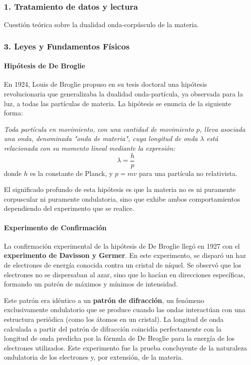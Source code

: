\subsubsection*{1. Tratamiento de datos y lectura}
Cuestión teórica sobre la dualidad onda-corpúsculo de la materia.

\subsubsection*{3. Leyes y Fundamentos Físicos}
\paragraph*{Hipótesis de De Broglie}
En 1924, Louis de Broglie propuso en su tesis doctoral una hipótesis revolucionaria que generalizaba la dualidad onda-partícula, ya observada para la luz, a todas las partículas de materia. La hipótesis se enuncia de la siguiente forma:

\textit{Toda partícula en movimiento, con una cantidad de movimiento $p$, lleva asociada una onda, denominada "onda de materia", cuya longitud de onda $\lambda$ está relacionada con su momento lineal mediante la expresión:}
$$ \lambda = \frac{h}{p} $$
donde $h$ es la constante de Planck, y $p=mv$ para una partícula no relativista.

El significado profundo de esta hipótesis es que la materia no es ni puramente corpuscular ni puramente ondulatoria, sino que exhibe ambos comportamientos dependiendo del experimento que se realice.

\paragraph*{Experimento de Confirmación}
La confirmación experimental de la hipótesis de De Broglie llegó en 1927 con el \textbf{experimento de Davisson y Germer}. En este experimento, se disparó un haz de electrones de energía conocida contra un cristal de níquel. Se observó que los electrones no se dispersaban al azar, sino que lo hacían en direcciones específicas, formando un patrón de máximos y mínimos de intensidad.

Este patrón era idéntico a un \textbf{patrón de difracción}, un fenómeno exclusivamente ondulatorio que se produce cuando las ondas interactúan con una estructura periódica (como los átomos en un cristal). La longitud de onda calculada a partir del patrón de difracción coincidía perfectamente con la longitud de onda predicha por la fórmula de De Broglie para la energía de los electrones utilizados. Este experimento fue la prueba concluyente de la naturaleza ondulatoria de los electrones y, por extensión, de la materia.

